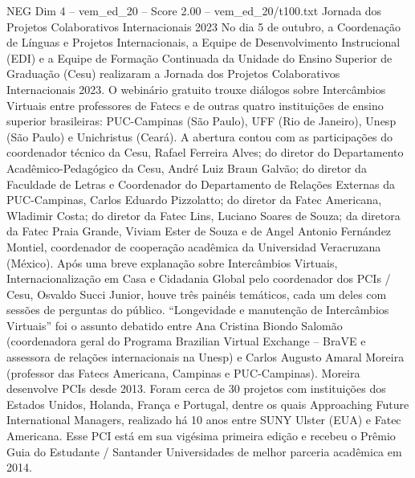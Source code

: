 \begin{textsample}{NEG Dim 4 – vem\_ed\_20 – Score 2.00 – vem\_ed\_20/t100.txt}  \label{ex:f4_neg_009}
Jornada dos Projetos Colaborativos Internacionais 2023 No dia 5 de outubro, a Coordenação de Línguas e Projetos Internacionais, a Equipe de Desenvolvimento Instrucional (EDI) e a Equipe de Formação Continuada da Unidade do Ensino Superior de Graduação (Cesu) realizaram a Jornada dos Projetos Colaborativos Internacionais 2023.
O webinário gratuito trouxe diálogos sobre Intercâmbios Virtuais entre professores de Fatecs e de outras quatro instituições de ensino superior brasileiras: PUC-Campinas (São Paulo), UFF (Rio de Janeiro), Unesp (São Paulo) e Unichristus (Ceará).
A abertura contou com as participações do coordenador técnico da Cesu, Rafael Ferreira Alves; do diretor do Departamento Acadêmico-Pedagógico da Cesu, André Luiz Braun Galvão; do diretor da Faculdade de Letras e Coordenador do Departamento de Relações Externas da PUC-Campinas, Carlos Eduardo Pizzolatto; do diretor da Fatec Americana, Wladimir Costa; do diretor da Fatec Lins, Luciano Soares de Souza; da diretora da Fatec Praia Grande, Viviam Ester de Souza e de Angel Antonio Fernández Montiel, coordenador de cooperação acadêmica da Universidad Veracruzana (México).
Após uma breve explanação sobre Intercâmbios Virtuais, Internacionalização em Casa e Cidadania Global pelo coordenador dos PCIs / Cesu, Osvaldo Succi Junior, houve três painéis temáticos, cada um deles com sessões de perguntas do público. “Longevidade e manutenção de Intercâmbios Virtuais” foi o assunto debatido entre Ana Cristina Biondo Salomão (coordenadora geral do Programa Brazilian Virtual Exchange – BraVE e assessora de relações internacionais na Unesp) e Carlos Augusto Amaral Moreira (professor das Fatecs Americana, Campinas e PUC-Campinas).
Moreira desenvolve PCIs desde 2013.
Foram cerca de 30 projetos com instituições dos Estados Unidos, Holanda, França e Portugal, dentre os quais Approaching Future International Managers, realizado há 10 anos entre SUNY Ulster (EUA) e Fatec Americana.
Esse PCI está em sua vigésima primeira edição e recebeu o Prêmio Guia do Estudante / Santander Universidades de melhor parceria acadêmica em 2014.

\end{textsample}
